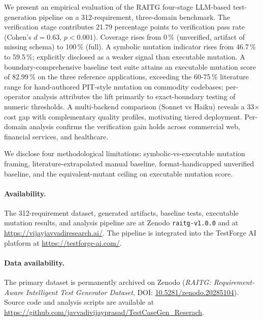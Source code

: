 \documentclass[10pt,twocolumn,letterpaper]{article}
\begin{document}
We present an empirical evaluation of the RAITG four-stage
LLM-based test-generation pipeline on a 312-requirement,
three-domain benchmark. The verification stage contributes 21.79
percentage points to verification pass rate (Cohen's $d = 0.63$,
$p < 0.001$). Coverage rises from 0\,\% (unverified, artifact of
missing schema) to 100\,\% (full). A symbolic mutation indicator
rises from 46.7\,\% to 59.5\,\%; explicitly disclosed as a
weaker signal than executable mutation. A boundary-comprehensive
baseline test suite attains an executable mutation score of
82.99\,\% on the three reference applications, exceeding the
60-75\,\% literature range for hand-authored PIT-style mutation on
commodity codebases; per-operator analysis attributes the lift
primarily to exact-boundary testing of numeric thresholds. A
multi-backend comparison (Sonnet vs Haiku) reveals a 33$\times$
cost gap with complementary quality profiles, motivating tiered
deployment. Per-domain analysis confirms the verification gain
holds across commercial web, financial services, and healthcare.

We disclose four methodological limitations: symbolic-vs-executable
mutation framing, literature-extrapolated manual baseline,
format-handicapped unverified baseline, and the
equivalent-mutant ceiling on executable mutation score.

\paragraph{Availability.} The 312-requirement dataset, generated artifacts, baseline tests, executable mutation results, and analysis pipeline are at Zenodo \texttt{raitg-v1.0.0} and at \url{https://vijayjavvadiresearch.ai/}. The pipeline is integrated into the TestForge AI platform at \url{https://testforge-ai.com/}.


\paragraph{Data availability.}The primary dataset is permanently archived on Zenodo (\textit{RAITG: Requirement-Aware Intelligent Test Generator Dataset}, DOI: \href{https://doi.org/10.5281/zenodo.20285104}{10.5281/zenodo.20285104}). Source code and analysis scripts are available at \url{https://github.com/javvadivijayprasad/TestCaseGen_Reserach}.



\end{document}
